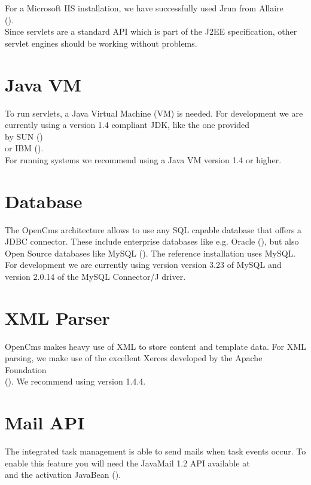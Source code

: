 For a Microsoft IIS installation, we have successfully used Jrun from Allaire \\
().\\
Since servlets are a standard API which is part of the J2EE specification,
other servlet engines should be working without problems.

\section{Java VM}
To run servlets, a Java Virtual Machine (VM) is needed. For development we are currently using
a version 1.4 compliant JDK, like the one provided \\
by SUN ()\\
or IBM ().\\
For running systems we recommend using a Java VM version 1.4 or higher.

\section{Database}
The OpenCms architecture allows to use any SQL capable database that offers a JDBC connector.
These include enterprise databases like e.g. Oracle (),
but also Open Source databases like MySQL ().
The reference installation uses MySQL. For development we are currently using version version 3.23 of 
MySQL and version 2.0.14 of the MySQL Connector/J driver.

\section{XML Parser}
OpenCms makes heavy use of XML to store content and template data. For XML parsing, we make use of
the excellent Xerces developed by the Apache Foundation\\
().
We recommend using version 1.4.4.

\section{Mail API}
The integrated task management is able to send mails when task events occur.
To enable this feature you will need the JavaMail 1.2 API available at \\
 and the activation Java\-Bean
().

